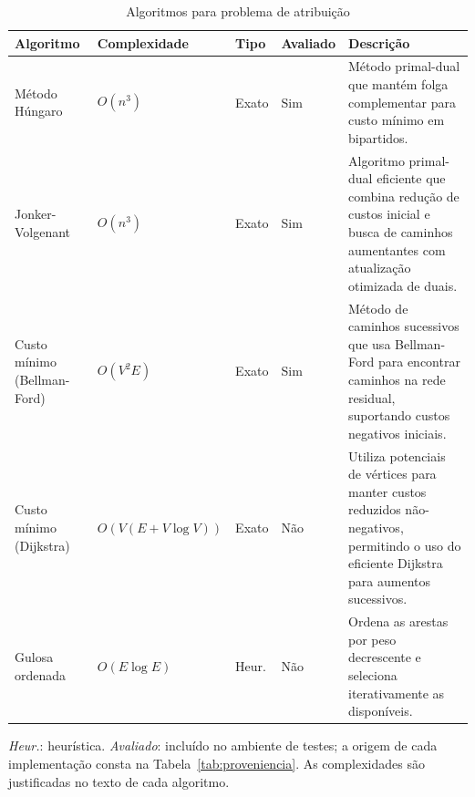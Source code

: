 \begin{table}[H]
    \centering
    \caption{Algoritmos para problema de atribuição}
    \label{tab:atribuicao_algos}
    \renewcommand{\arraystretch}{1.2} %
    \footnotesize
    
    \begin{tabularx}{\textwidth}{@{} >{\raggedright\arraybackslash}p{2.8cm} l l l >{\raggedright\arraybackslash}X @{}}
        \toprule
        \textbf{Algoritmo} & \textbf{Complexidade} & \textbf{Tipo} & \textbf{Avaliado} & \textbf{Descrição} \\
        \midrule
        
        Método Húngaro & $O(n^3)$ & Exato & Sim & 
        Método primal-dual que mantém folga complementar para custo mínimo em bipartidos. \\
        \addlinespace 
        
        Jonker-Volgenant & $O(n^3)$ & Exato & Sim & 
        Algoritmo primal-dual eficiente que combina redução de custos inicial e busca de caminhos aumentantes com atualização otimizada de duais. \\
        \addlinespace
        
        Custo mínimo (Bellman-Ford) & $O(V^2E)$ & Exato & Sim & 
        Método de caminhos sucessivos que usa Bellman-Ford para encontrar caminhos na rede residual, suportando custos negativos iniciais. \\
        \addlinespace
        
        Custo mínimo (Dijkstra) & $O(V(E+V \log V))$ & Exato & Não & 
        Utiliza potenciais de vértices para manter custos reduzidos não-negativos, permitindo o uso do eficiente Dijkstra para aumentos sucessivos. \\
        \addlinespace
        
        Gulosa ordenada & $O(E \log E)$ & Heur. & Não & 
        Ordena as arestas por peso decrescente e seleciona iterativamente as disponíveis. \\

        \bottomrule
    \end{tabularx}
    \par\smallskip
    {\raggedright\footnotesize \textit{Heur.}: heurística. \textit{Avaliado}: incluído no ambiente de testes; a origem de cada implementação consta na Tabela~\ref{tab:proveniencia}. As complexidades são justificadas no texto de cada algoritmo.\par}
\end{table}

